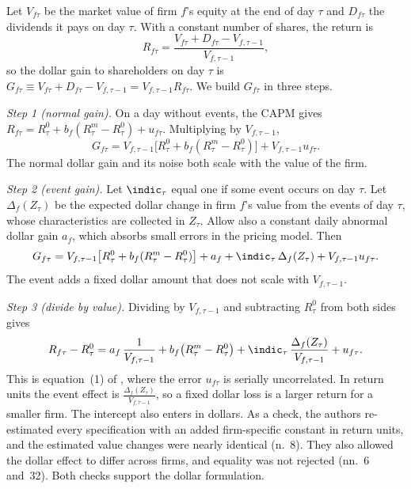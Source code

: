 Let $V_{f\tau}$ be the market value of firm $f$'s equity at the end of day $\tau$ and $D_{f\tau}$ the
dividends it pays on day $\tau$. With a constant number of shares, the return is
\begin{equation*}
R_{f\tau}=\frac{V_{f\tau}+D_{f\tau}-V_{f,\tau-1}}{V_{f,\tau-1}},
\end{equation*}
so the dollar gain to shareholders on day $\tau$ is $G_{f\tau}\equiv V_{f\tau}+D_{f\tau}-V_{f,\tau-1}=
V_{f,\tau-1}R_{f\tau}$. We build $G_{f\tau}$ in three steps.

\emph{Step 1 (normal gain).} On a day without events, the CAPM gives
$R_{f\tau}=R^0_\tau+b_f(R^m_\tau-R^0_\tau)+u_{f\tau}$. Multiplying by $V_{f,\tau-1}$,
\begin{equation*}
G_{f\tau}=V_{f,\tau-1}\big[R^0_\tau+b_f(R^m_\tau-R^0_\tau)\big]+V_{f,\tau-1}u_{f\tau}.
\end{equation*}
The normal dollar gain and its noise both scale with the value of the firm.

\emph{Step 2 (event gain).} Let $\indic_\tau$ equal one if some event occurs on day $\tau$. Let
$\Delta_f(Z_\tau)$ be the expected dollar change in firm $f$'s value from the events of day $\tau$,
whose characteristics are collected in $Z_\tau$. Allow also a constant daily abnormal dollar gain
$a_f$, which absorbs small errors in the pricing model. Then
\begin{equation*}
G_{f\tau}=V_{f,\tau-1}\big[R^0_\tau+b_f(R^m_\tau-R^0_\tau)\big]+a_f+\indic_\tau\,\Delta_f(Z_\tau)
+V_{f,\tau-1}u_{f\tau}.
\end{equation*}
The event adds a fixed dollar amount that does not scale with $V_{f,\tau-1}$.

\emph{Step 3 (divide by value).} Dividing by $V_{f,\tau-1}$ and subtracting $R^0_\tau$ from both sides
gives
\begin{equation}\label{eq:09-wc-dollar}
R_{f\tau}-R^0_\tau=a_f\,\frac{1}{V_{f,\tau-1}}+b_f\big(R^m_\tau-R^0_\tau\big)
+\indic_\tau\,\frac{\Delta_f(Z_\tau)}{V_{f,\tau-1}}+u_{f\tau}.
\end{equation}
This is equation~(1) of \citet{WhinstonCollins1992}, where the error $u_{f\tau}$ is serially
uncorrelated. In return units the event effect is $\frac{\Delta_f(Z_\tau)}{V_{f,\tau-1}}$, so a fixed
dollar loss is a larger return for a smaller firm. The intercept also enters in dollars. As a check,
the authors re-estimated every specification with an added firm-specific constant in return units,
and the estimated value changes were nearly identical (n.~8). They also allowed the dollar
effect to differ across firms, and equality was not rejected (nn.~6 and~32). Both checks support
the dollar formulation.

